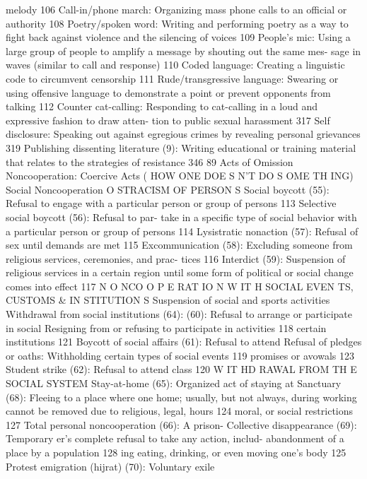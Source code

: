 \documentclass[twoside,a4paper,12pt,fleqn,openany]{extbook}
\begin{document}
melody
 106
Call-in/phone march: Organizing mass phone
calls to an official or authority
 108
Poetry/spoken word: Writing and performing
poetry as a way to fight back against violence
and the silencing of voices
 109
People’s mic: Using a large group of people to
amplify a message by shouting out the same mes-
sage in waves (similar to call and response) 110
Coded language: Creating a linguistic code to
circumvent censorship
 111
Rude/transgressive language: Swearing or
using offensive language to demonstrate a
point or prevent opponents from talking 112
Counter cat-calling: Responding to cat-calling
in a loud and expressive fashion to draw atten-
tion to public sexual harassment
 317
Self disclosure: Speaking out against egregious
crimes by revealing personal grievances 319
Publishing dissenting literature (9): Writing
educational or training material that relates to
the strategies of resistance
 346
89
Acts of Omission
Noncooperation: Coercive Acts
( HOW ONE DOE S N’T DO S OME TH ING)
Social Noncooperation
O STRACISM OF PERSON S
Social boycott (55): Refusal to engage with a
particular person or group of persons
 113
Selective social boycott (56): Refusal to par-
take in a specific type of social behavior with a
particular person or group of persons
 114
Lysistratic nonaction (57): Refusal of sex until
demands are met
 115
Excommunication (58): Excluding someone
from religious services, ceremonies, and prac-
tices
 116
Interdict (59): Suspension of religious services
in a certain region until some form of political
or social change comes into effect
 117
N O NCO O P E RAT IO N W IT H SOCIAL EVEN TS, CUSTOMS & IN STITUTION S
Suspension of social and sports activities
 Withdrawal from social institutions (64):
(60): Refusal to arrange or participate in social
 Resigning from or refusing to participate in
activities
 118
 certain institutions
 121
Boycott of social affairs (61): Refusal to attend
 Refusal of pledges or oaths: Withholding
certain types of social events
 119
 promises or avowals
 123
Student strike (62): Refusal to attend class		
120
W IT HD RAWAL FROM TH E SOCIAL SYSTEM
Stay-at-home (65): Organized act of staying at
 Sanctuary (68): Fleeing to a place where one
home; usually, but not always, during working
 cannot be removed due to religious, legal,
hours
 124
 moral, or social restrictions
 127
Total personal noncooperation (66): A prison-
 Collective disappearance (69): Temporary
er’s complete refusal to take any action, includ-
 abandonment of a place by a population 128
ing eating, drinking, or even moving one’s
body
 125
 Protest emigration (hijrat) (70): Voluntary exile
\end{document}
